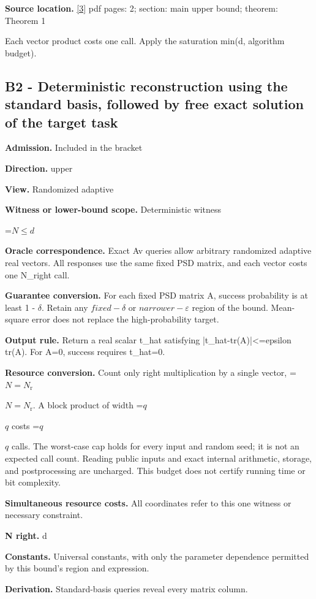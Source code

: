 \documentclass[10pt,a4paper]{article}
\newcommand{\AtlasMath}[1]{\par\begingroup\centering\setbox0=\hbox{$\displaystyle #1$}\ifdim\wd0>1.4\linewidth\typeout{ATLAS WIDE FORMULA: \the\wd0}\fi\ifdim\wd0>\linewidth\resizebox{\linewidth}{!}{\box0}\else\box0\fi\par\endgroup}
\newcommand{\AtlasInlineMath}[1]{\begingroup\setbox0=\hbox{$#1$}\ifdim\wd0>.4\linewidth\endgroup\AtlasMath{#1}\else\endgroup$#1$\fi}
\begin{document}
\textbf{Source location.} \href{https://arxiv.org/pdf/2010.09649v5}{[3]} pdf pages: 2; section: main upper bound; theorem: Theorem 1

Each vector product costs one call. Apply the saturation min(d, algorithm budget).

\subsection{B2 - Deterministic reconstruction using the standard basis, followed by free exact solution of the target task}
\textbf{Admission.} Included in the bracket

\textbf{Direction.} upper

\textbf{View.} Randomized adaptive

\textbf{Witness or lower-bound scope.} Deterministic witness

\AtlasMath{N\le d}
\textbf{Oracle correspondence.} Exact Av queries allow arbitrary randomized adaptive real vectors. All responses use the same fixed PSD matrix, and each vector costs one N\_\allowbreak{}right call.

\textbf{Guarantee conversion.} For each fixed PSD matrix A, success probability is at least 1 - $\delta$. Retain any $fixed-\delta$ or $narrower-\varepsilon$ region of the bound. Mean-square error does not replace the high-probability target.

\textbf{Output rule.} Return a real scalar t\_\allowbreak{}hat satisfying |t\_\allowbreak{}hat-tr(A)|<=epsilon tr(A). For A=0, success requires t\_\allowbreak{}hat=0.

\textbf{Resource conversion.} Count only right multiplication by a single vector, \AtlasInlineMath{N=N_{\mathrm r}}. A block product of width \AtlasInlineMath{q} costs \AtlasInlineMath{q} calls. The worst-case cap holds for every input and random seed; it is not an expected call count. Reading public inputs and exact internal arithmetic, storage, and postprocessing are uncharged. This budget does not certify running time or bit complexity.

\textbf{Simultaneous resource costs.} All coordinates refer to this one witness or necessary constraint.

\textbf{N right.} d

\textbf{Constants.} Universal constants, with only the parameter dependence permitted by this bound’s region and expression.

\textbf{Derivation.} Standard-basis queries reveal every matrix column.
\end{document}
